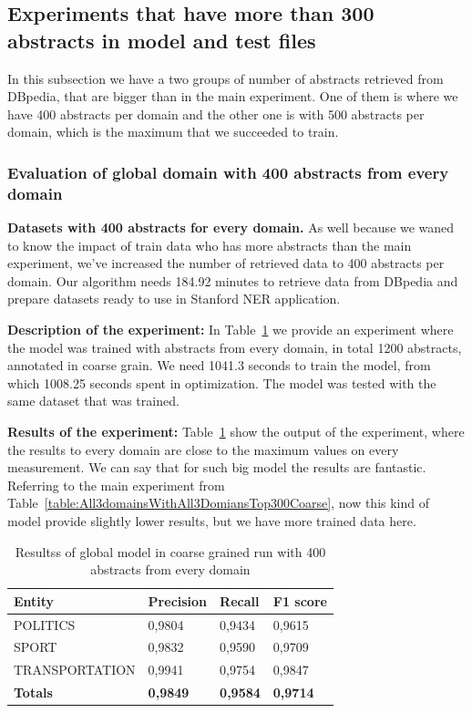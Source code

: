 \documentclass[thesis=M,english]{FITthesis}[2018/05/30]
\begin{document}
\subsection{Experiments that have more than 300 abstracts in model and test files}\label{MoreThan300Abstracts}
In this subsection we have a two groups of number of abstracts retrieved from DBpedia, that are bigger than in the main experiment. One of them is where we have 400 abstracts per domain and the other one is with 500 abstracts per domain, which is the maximum that we succeeded to train.

\subsubsection{Evaluation of global domain with 400 abstracts from every domain }
\textbf{Datasets with 400 abstracts for every domain.} As well because we waned to know the impact of train data who has more abstracts than the main experiment, we've increased the number of retrieved data to 400 abstracts per domain. Our algorithm needs 184.92 minutes to retrieve data from DBpedia and prepare datasets ready to use in Stanford NER application.

\textbf{Description of the experiment:} In Table~\ref{table:400GlobalDomainWithAllAbstractsTop400Coarse} we provide an experiment where the model was trained with abstracts from every domain, in total 1200 abstracts, annotated in coarse grain. We need 1041.3 seconds to train the model, from which 1008.25 seconds spent in optimization. The model was tested with the same dataset that was trained.    

\textbf{Results of the experiment:} Table~\ref{table:400GlobalDomainWithAllAbstractsTop400Coarse} show the output of the experiment, where the results to every domain are close to the maximum values on every measurement. We can say that for such big model the results are fantastic. Referring to the main experiment from Table~\ref{table:All3domainsWithAll3DomiansTop300Coarse}, now this kind of model provide slightly lower results, but we have more trained data here.

	\begin{table}[H]\centering
		\begin{tabular}{|l|l|l|l|}
			\hline {\textbf{Entity}} & {\textbf{Precision}} & {\textbf{Recall}} & {\textbf{F1 score}}\\\hline
				POLITICS & 0,9804 & 0,9434 & 0,9615\\
				SPORT & 0,9832 & 0,9590 & 0,9709\\
				TRANSPORTATION & 0,9941 & 0,9754 & 0,9847\\\hline
				\textbf{Totals} & \textbf{0,9849} & \textbf{0,9584} & \textbf{0,9714}\\\hline
		\end{tabular}
		\caption{Resultss of global model in coarse grained run with 400 abstracts from every domain \label{table:400GlobalDomainWithAllAbstractsTop400Coarse}}
	\end{table}
\end{document}
